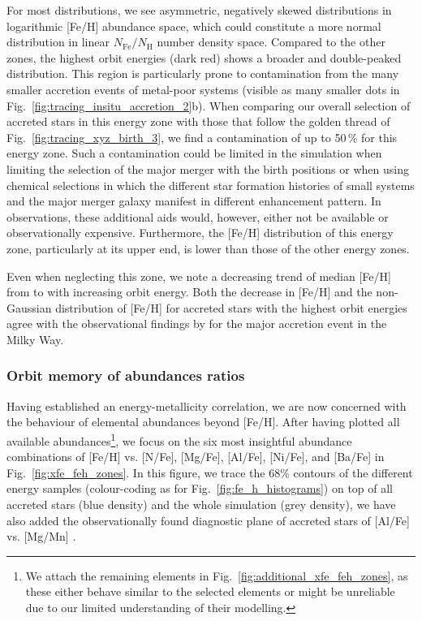\documentclass[fleqn,usenatbib]{mnras}
\begin{document}
For most distributions, we see asymmetric, negatively skewed distributions in logarithmic [Fe/H] abundance space, which could constitute a more normal distribution in linear $N_\mathrm{Fe}/N_\mathrm{H}$ number density space. Compared to the other zones, the highest orbit energies (dark red) shows a broader and double-peaked distribution. This region is particularly prone to contamination from the many smaller accretion events of metal-poor systems (visible as many smaller dots in Fig.~\ref{fig:tracing_insitu_accretion_2}b). When comparing our overall selection of accreted stars in this energy zone with those that follow the golden thread of Fig.~\ref{fig:tracing_xyz_birth_3}, we find a contamination of up to 50\,\% for this energy zone. Such a contamination could be limited in the simulation when limiting the selection of the major merger with the birth positions or when using chemical selections in which the different star formation histories of small systems and the major merger galaxy manifest in different enhancement pattern. In observations, these additional aids would, however, either not be available or observationally expensive. Furthermore, the [Fe/H] distribution of this energy zone, particularly at its upper end, is lower than those of the other energy zones.

Even when neglecting this zone, we note a decreasing trend of median [Fe/H] from  to  with increasing orbit energy. Both the decrease in [Fe/H] and the non-Gaussian distribution of [Fe/H] for accreted stars with the highest orbit energies agree with the observational findings by \citet[][see their Fig.~3]{Skuladottir2025} for the major accretion event in the Milky Way.

\subsubsection{Orbit memory of abundances ratios}

Having established an energy-metallicity correlation, we are now concerned with the behaviour of elemental abundances beyond [Fe/H]. After having plotted all available abundances\footnote{We attach the remaining elements in Fig.~\ref{fig:additional_xfe_feh_zones}, as these either behave similar to the selected elements or might be unreliable due to our limited understanding of their modelling.}, we focus on the six most insightful abundance combinations of [Fe/H] vs. [N/Fe], [Mg/Fe], [Al/Fe], [Ni/Fe], and [Ba/Fe] in Fig.~\ref{fig:xfe_feh_zones}. In this figure, we trace the 68\% contours of the different energy samples (colour-coding as for Fig.~\ref{fig:fe_h_histograms}) on top of all accreted stars (blue density) and the whole simulation (grey density), we have also added the observationally found diagnostic plane of accreted stars of [Al/Fe] vs. [Mg/Mn] \citep{Hawkins2015, Das2020}.
\end{document}
